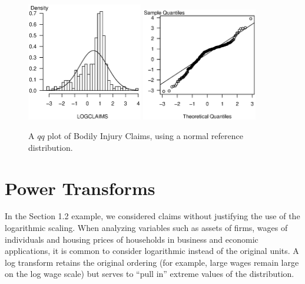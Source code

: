 \begin{figure}[htp]
  \begin{center}
    \includegraphics[width=0.45\textwidth]
        {Chapter1/F1BIHistRedraw.eps}
      \hfill
            \includegraphics[width=0.45\textwidth]
        {Chapter1/F1BIQQPlot.eps}

      \end{center}
           \parbox[t]{2.5in}{\caption {\label{F1:BIHistRedraw}
           {\small Re-drawing of Figure \ref{F1:BIHist} with an increased number of rectangles.}}} \hfill
        \parbox[t]{2.5in}{\caption {\label{F1:BIQQPlot} {\small A $qq$ plot of
Bodily Injury Claims, using a normal reference distribution.}}}

\end{figure}


\section{Power Transforms}\label{S1:PowerTransforms}

In the Section 1.2 example, we considered claims without justifying
the use of the logarithmic scaling. When analyzing variables such as
assets of firms, wages of individuals and housing prices of
households in business and economic applications, it is common to
consider logarithmic instead of the original units. A log transform
retains the original ordering (for example, large wages remain large
on the log wage scale) but serves to ``pull in'' extreme values of
the distribution.


